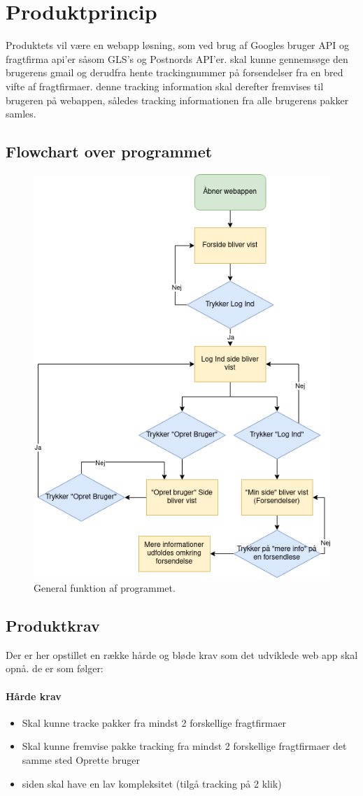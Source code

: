 \chapter{Produktprincip}
Produktets vil være en webapp løsning, som ved brug af Googles bruger API og fragtfirma 
api'er såsom GLS's og Postnords API'er. skal kunne gennemsøge den brugerens gmail og 
derudfra hente trackingnummer på forsendelser fra en bred vifte af fragtfirmaer. denne 
tracking information skal derefter fremvises til brugeren på webappen, således tracking 
informationen fra alle brugerens pakker samles.
\section{Flowchart over programmet}
\begin{figure}[h]
    \includegraphics[width=0.5\linewidth]{Pictures/flowchat-main.png}
    \centering
    \caption{General funktion af programmet.}
     \label{fig:Flowchat}
  \end{figure}
  

\section{Produktkrav}
Der er her opstillet en række hårde og bløde krav som det udviklede web app skal opnå. de er som følger:

\subsubsection{Hårde krav}
\begin{itemize}
    \item Skal kunne tracke pakker fra mindst 2 forskellige fragtfirmaer
    \item Skal kunne fremvise pakke tracking fra mindst 2 forskellige fragtfirmaer det samme sted
    Oprette bruger
    \item siden skal have en lav kompleksitet (tilgå tracking på 2 klik)
\end{itemize}


